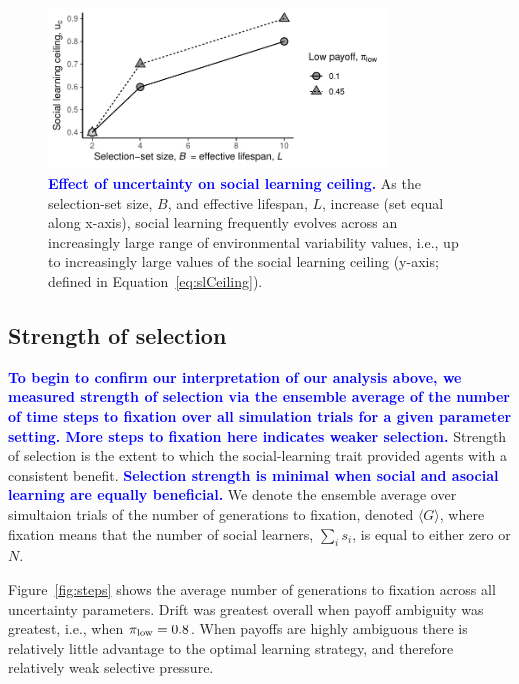 \documentclass[letterpaper,11.5pt]{scrartcl}
\newcommand{\edit}[1]{{\bfseries \textcolor{blue} {#1}}}
\begin{document}
\begin{figure}
  \caption{\edit{Effect of uncertainty on social learning ceiling.} As the selection-set size, $B$, and effective lifespan, $L$, increase (set equal along x-axis), 
  social learning frequently evolves across an increasingly large range of
  environmental variability values, i.e., up to
  increasingly large values of the social learning ceiling
(y-axis; defined in Equation~\ref{eq:slCeiling}).}
  \label{fig:slCeiling}
  \centering
    \includegraphics[width=0.8\textwidth]{Figures/SL_ceiling.pdf}
\end{figure}


\subsection{Strength of selection}

\edit{To begin to confirm our interpretation of our analysis above, we measured
  strength of selection via the ensemble average of the number of
time steps to fixation over all simulation trials for a given parameter setting. More steps to fixation here indicates weaker selection.} Strength of selection is the extent to which the
social-learning trait provided agents with a consistent benefit. \edit{Selection
  strength is minimal when social and asocial learning
are equally beneficial.} 
We denote the ensemble average over simultaion trials of the number of generations to fixation, denoted $\langle G \rangle$, where fixation means that the number of social learners, $\sum_i s_i$, is equal to either zero or $N$. %

Figure~\ref{fig:steps} shows the average number of generations to fixation across all uncertainty parameters. Drift was greatest overall when payoff ambiguity was greatest, i.e., when $\pi_{\mathrm{low}} = 0.8$. When payoffs are highly ambiguous there is relatively little advantage to the optimal learning strategy, and therefore relatively weak selective pressure.
\end{document}
